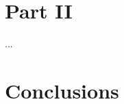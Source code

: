 \begin{comment}
Expected value of the future service.

EL límite alto en el software está marcado por el servicio futuro que me ofrece, mirando hacia adelante no lo que ha hecho hasta ese momento. Estabilidad del software, soporte, documentación, adaptación o como se puede conseguir una certificación. A diferencia de los bienes físicos no se piensa en cuanto se puede conseguir el mismo producto actualizado mientras que en un físico si que se mira atrás.

    Services == Source of revenues

En Software no compras el producto, valoras el servicio que te ofrece.

La organizaciónd el modelo de Software Libre permite ofrecer mejores servicios:
\begin{itemize}
    \item Usuarios que se convierten en clientes.
    \item escalabilidad en identificación de fallos. Los programas de éxito suelen tener menos errores, el éxito medido en usuario.
    \item Compartir riesgos y costes de producción. Entre los actores se comparte el gasto del desarrollo.
    \item Prácticas monopolísticas muy difíciles. Un fork permite escapar de la monopolización del producto.
\end{itemize}

\emph{Si no tienes usuarios no tienes modelo de negocio.}
\end{comment}

\section{Part II}\label{Part II} %

...

\section{Conclusions}\label{conclusions}
